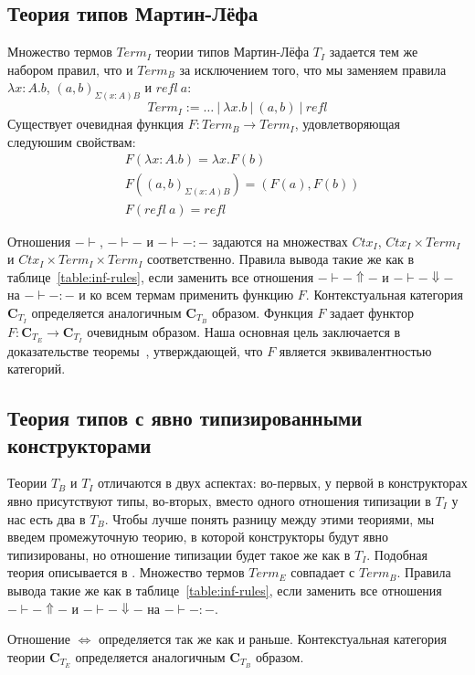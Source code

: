 \documentclass{amsart}
\theoremstyle{definition}
\theoremstyle{remark}
\newcommand{\deq}{\Leftrightarrow}
\newcommand{\cat}[1]{\mathbf{#1}}
\renewcommand{\C}{\cat{C}}
\numberwithin{figure}{section}
\begin{document}
\subsection{Теория типов Мартин-Лёфа}

Множество термов $Term_I$ теории типов Мартин-Лёфа $T_I$ задается тем же набором правил, что и $Term_B$ за исключением того, что мы заменяем правила $\lambda x : A. b$, $(a, b)_{\Sigma (x : A) B}$ и $refl\ a$:
\[ Term_I := \ldots\ |\ \lambda x. b\ |\ (a, b)\ |\ refl \]
Существует очевидная функция $F : Term_B \to Term_I$, удовлетворяющая следуюшим свойствам:
\begin{align*}
& F(\lambda x : A. b) = \lambda x. F(b) \\
& F((a, b)_{\Sigma (x : A) B}) = (F(a), F(b)) \\
& F(refl\ a) = refl
\end{align*}

Отношения $- \vdash$, $- \vdash -$ и $- \vdash - : -$ задаются на множествах $Ctx_I$, $Ctx_I \times Term_I$ и $Ctx_I \times Term_I \times Term_I$ соответственно.
Правила вывода такие же как в таблице~\ref{table:inf-rules}, если заменить все отношения $- \vdash - \Uparrow -$ и $- \vdash - \Downarrow -$ на $- \vdash - : -$ и ко всем термам применить функцию $F$.
Контекстуальная категория $\C_{T_I}$ определяется аналогичным $\C_{T_B}$ образом.
Функция $F$ задает функтор $F : \C_{T_E} \to \C_{T_I}$ очевидным образом.
Наша основная цель заключается в доказательстве теоремы~, утверждающей, что $F$ является эквивалентностью категорий.

\subsection{Теория типов с явно типизированными конструкторами}

Теории $T_B$ и $T_I$ отличаются в двух аспектах: во-первых, у первой в конструкторах явно присутствуют типы, во-вторых, вместо одного отношения типизации в $T_I$ у нас есть два в $T_B$.
Чтобы лучше понять разницу между этими теориями, мы введем промежуточную теорию, в которой конструкторы будут явно типизированы, но отношение типизации будет такое же как в $T_I$.
Подобная теория описывается в \cite{luo94}.
Множество термов $Term_E$ совпадает с $Term_B$.
Правила вывода такие же как в таблице~\ref{table:inf-rules}, если заменить все отношения $- \vdash - \Uparrow -$ и $- \vdash - \Downarrow -$ на $- \vdash - : -$.

Отношение $\deq$ определяется так же как и раньше.
Контекстуальная категория теории $\C_{T_E}$ определяется аналогичным $\C_{T_B}$ образом.
\end{document}
